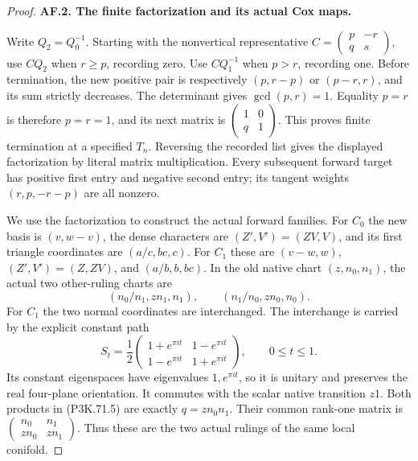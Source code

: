 \begin{proof}
\par\medskip\noindent\textbf{AF.2. The finite factorization and its actual Cox maps.}\par\nopagebreak[4]

Write \(Q_2=Q_0^{-1}\). Starting with the nonvertical representative
\(C=(\begin{smallmatrix}p&-r\\q&s\end{smallmatrix})\), use
\(C Q_2\) when \(r\ge p\), recording zero. Use \(C Q_1^{-1}\)
when \(p>r\), recording one. Before termination, the new positive
pair is respectively \((p,r-p)\) or \((p-r,r)\), and its sum
strictly decreases. The determinant gives \(\gcd(p,r)=1\).
Equality \(p=r\) is therefore \(p=r=1\), and its next matrix
is \((\begin{smallmatrix}1&0\\q&1\end{smallmatrix})\).
This proves finite termination at a specified \(T_n\).
Reversing the recorded list gives the displayed factorization
by literal matrix multiplication. Every subsequent forward
target has positive first entry and negative second entry;
its tangent weights \((r,p,-r-p)\) are all nonzero.

We use the factorization to construct the actual forward families.
For \(C_0\) the new basis is \((v,w-v)\), the dense characters
are \((Z',V')=(ZV,V)\), and its first triangle coordinates are
\((a/c,bc,c)\). For \(C_1\) these are \((v-w,w)\),
\((Z',V')=(Z,ZV)\), and \((a/b,b,bc)\). In the old native
chart \((z,n_0,n_1)\), the actual two other-ruling charts are
\[
 (n_0/n_1,zn_1,n_1),\qquad(n_1/n_0,zn_0,n_0).       \tag{P3K.71.5}
\]
For \(C_1\) the two normal coordinates are interchanged. The
interchange is carried by the explicit constant path
\[
 S_t=\frac12\begin{pmatrix}
 1+e^{\pi it}&1-e^{\pi it}\\
 1-e^{\pi it}&1+e^{\pi it}
 \end{pmatrix},\qquad 0\le t\le1.                    \tag{P3K.71.6}
\]
Its constant eigenspaces have eigenvalues \(1,e^{\pi it}\),
so it is unitary and preserves the real four-plane orientation.
It commutes with the scalar native transition \(z1\).
Both products in (P3K.71.5) are exactly \(q=zn_0n_1\).
Their common rank-one matrix is
\( (\begin{smallmatrix}n_0&n_1\\zn_0&zn_1\end{smallmatrix})\).
Thus these are the two actual rulings of the same local conifold.


\end{proof}
